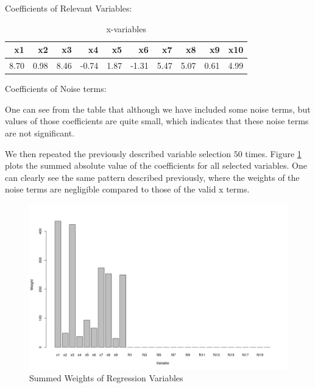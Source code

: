 \documentclass{article}
\begin{document}
\vspace{3mm}
\noindent

Coefficients of Relevant Variables:
\begin{table}[ht]
\centering
\caption{x-variables}
\begin{tabular}{r|r|r|r|r|r|r|r|r|r}
  \hline
 x1 & x2 & x3 & x4 & x5 & x6 & x7 & x8 & x9 & x10 \\
  \hline
8.70 & 0.98 & 8.46 & -0.74 & 1.87 & -1.31 & 5.47 & 5.07 & 0.61 & 4.99 \\
   \hline
\end{tabular}\label{Table:8}
\end{table}

\noindent
Coefficients of Noise terms:
\begin{table}[ht]
\centering
\caption{n-Noise terms}
\label{Table:9}
\end{table}

\noindent
One can see from the table that although we have included some noise terms, but values of those coefficients are quite small, which indicates that these noise terms are not significant.

We then repeated the previously described variable selection $ 50 $ times. Figure \ref{Figure: 1} plots the summed absolute value of the coefficients for all selected variables. One can clearly see the same pattern described previously, where the weights of the noise terms are negligible compared to those of the valid x terms.

\begin{figure}
\includegraphics{barplot}
\caption{Summed Weights of Regression Variables}
\label{Figure: 1}
\end{figure}
\end{document}
